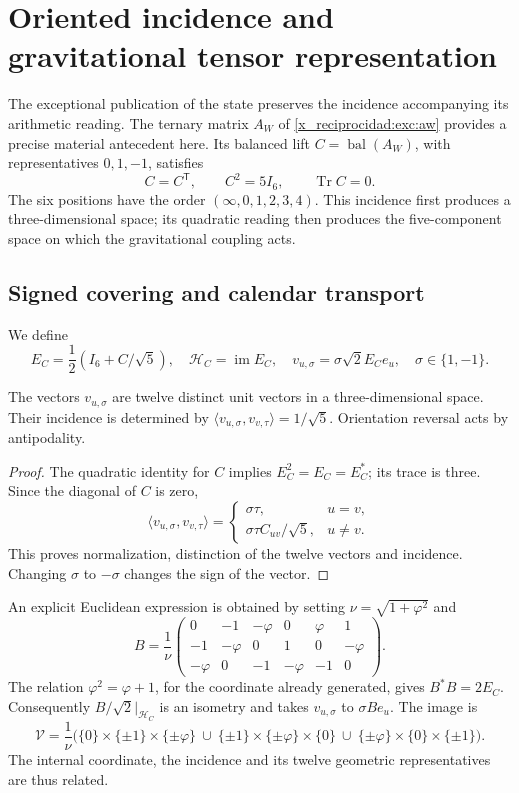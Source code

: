 \chapter{Oriented incidence and gravitational tensor representation}
\label{x_reciprocidad:vii:sec:pentacomponente}
The exceptional publication of the state preserves the incidence accompanying
its arithmetic reading. The ternary matrix \(A_W\) of
\eqref{x_reciprocidad:exc:aw} provides a precise material antecedent here. Its
balanced lift \(C=\operatorname{bal}(A_W)\), with representatives
\(0,1,-1\), satisfies
\[
 C=C^{\mathsf T},\qquad C^2=5I_6,\qquad \operatorname{Tr}C=0.
\]
The six positions have the order \((\infty,0,1,2,3,4)\).
This incidence first produces a three-dimensional space; its quadratic
reading then produces the five-component space on which
the gravitational coupling acts.

\section{Signed covering and calendar transport}
We define
\[
 E_C=\frac12(I_6+C/\sqrt5),\quad
 \mathcal H_C=\operatorname{im}E_C,\quad
 v_{u,\sigma}=\sigma\sqrt2E_Ce_u,\quad \sigma\in\{1,-1\}.
\]
\begin{proposition}
\label{x_reciprocidad:vii:prop:doce-orientadas}
The vectors \(v_{u,\sigma}\) are twelve distinct unit vectors
in a three-dimensional space. Their incidence is determined by
\(\langle v_{u,\sigma},v_{v,\tau}\rangle=1/\sqrt5\).
Orientation reversal acts by antipodality.
\end{proposition}
\begin{proof}
The quadratic identity for \(C\) implies \(E_C^2=E_C=E_C^*\);
its trace is three. Since the diagonal of \(C\) is zero,
\[
 \langle v_{u,\sigma},v_{v,\tau}\rangle
 =\begin{cases}\sigma\tau,&u=v,\\
 \sigma\tau C_{uv}/\sqrt5,&u\ne v.
 \end{cases}
\]
This proves normalization, distinction of the twelve vectors and incidence.
Changing \(\sigma\) to \(-\sigma\) changes the sign of the vector.
\end{proof}

An explicit Euclidean expression is obtained by setting
\(\nu=\sqrt{1+\varphi^2}\) and
\[
 B=\frac1\nu
 \begin{pmatrix}
 0&-1&-\varphi&0&\varphi&1\\
 -1&-\varphi&0&1&0&-\varphi\\
 -\varphi&0&-1&-\varphi&-1&0
 \end{pmatrix}.
\]
The relation \(\varphi^2=\varphi+1\), for the coordinate already generated,
gives \(B^*B=2E_C\).
Consequently \(B/\sqrt2|_{\mathcal H_C}\) is an isometry and takes
\(v_{u,\sigma}\) to \(\sigma Be_u\). The image is
\[
 \mathcal V=\frac1\nu\bigl(
 \{0\}\times\{\pm1\}\times\{\pm\varphi\}\ \cup\
 \{\pm1\}\times\{\pm\varphi\}\times\{0\}\ \cup\
 \{\pm\varphi\}\times\{0\}\times\{\pm1\}\bigr).
\]
The internal coordinate, the incidence and its
twelve geometric representatives are thus related.


